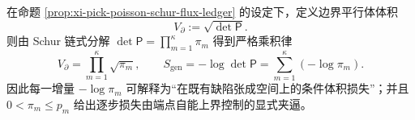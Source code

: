 
\begin{remark}[条件通量即条件体积：\texorpdfstring{$V_{\partial}=\prod_m\sqrt{\pi_m}$}{Vpartial=prod sqrt(pi_m)}]\label{rem:xi-pick-poisson-schur-conditional-volume}
在命题 \ref{prop:xi-pick-poisson-schur-flux-ledger} 的设定下，定义边界平行体体积
\[
V_{\partial}:=\sqrt{\det\mathsf P}.
\]
则由 Schur 链式分解 \(\det\mathsf P=\prod_{m=1}^{\kappa}\pi_m\) 得到严格乘积律
\[
\boxed{\;
V_{\partial}=\prod_{m=1}^{\kappa}\sqrt{\pi_m},\qquad
S_{\mathrm{gen}}=-\log\det\mathsf P=\sum_{m=1}^{\kappa}(-\log\pi_m).\;}
\]
因此每一增量 \(-\log\pi_m\) 可解释为“在既有缺陷张成空间上的条件体积损失”；并且 \(0<\pi_m\le p_m\) 给出逐步损失由端点自能上界控制的显式夹逼。
\end{remark}


